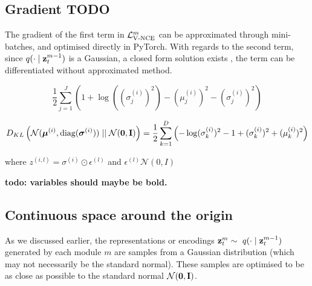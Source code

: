 	\subsection{Gradient \textbf{TODO}}
		The gradient of the first term in $\mathcal{L}_{\text{V-NCE}}^m$ can be approximated through mini-batches, and optimised directly in PyTorch. With regards to the second term, since $q(\cdot \mid \mathbf{z}_t^{m-1})$ is a Gaussian, a closed form solution exists \cite{kingmaAutoEncodingVariationalBayes2022}, the term can be differentiated without approximated method.
		
		
		\begin{equation}
			\frac{1}{2}\sum_{j=1}^J \left( 1 + \log((\sigma_j^{(i)})^2) - (\mu_j^{(i)})^2 - (\sigma_j^{(i)})^2 \right) 
		\end{equation}
		
		\begin{equation} %
			\kl{\normal}{\standardnormal} = \latentspaceconstraintclosedform
		\end{equation}
		
		
		where $z^(i,l) = \sigma ^{(i)} \odot \epsilon^{(l)}$ and $\epsilon^(l) \mathcal{N}(0, I)$
		
		\textbf{todo: variables should maybe be bold.}
		
		
	
	
	\subsection{Continuous space around the origin}
			As we discussed earlier, the representations or encodings $\mathbf{z}_t^m \sim ~ q(\cdot \mid \mathbf{z}_t^{m-1})$ generated by each module $m$ are samples from a Gaussian distribution (which may not necessarily be the standard normal). These samples are optimised to be as close as possible to the standard normal $\mathcal{N}(\bm{\mathbf{0}}, \mathbf{I})$. 
	
